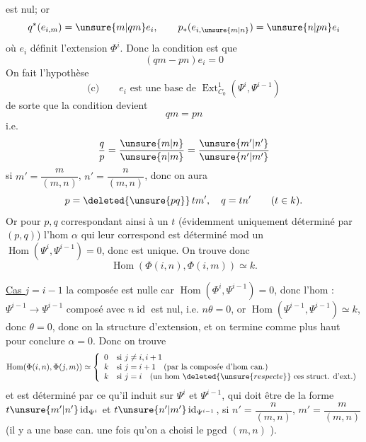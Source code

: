 est nul; or
\[
q^*(e_{i,m})=\unsure{m|qm}e_i,\qquad
p_*(e_{i,\unsure{m|n}})=\unsure{n|pn}e_i
\]
où $e_i$ définit l'extension $\Phi^i$.
Donc la condition est que
\[
(qm-pn)e_i=0
\]
On fait l'hypothèse
\[
\text{(c)}\qquad
\boxed{e_i\text{ est une base de }\operatorname{Ext}^1_{C_0}(\Psi^i,\Psi^{i-1})}
\]
de sorte que la condition devient
\[
qm=pn
\]
i.e.\quad
\[
\frac q p=\frac{\unsure{m|n}}{\unsure{n|m}}
=\frac{\unsure{m'|n'}}{\unsure{n'|m'}}
\]
si $m'=\dfrac{m}{(m,n)}$, $n'=\dfrac{n}{(m,n)}$, donc
on aura
\[
p=\deleted{\unsure{pq}}\,t m',\quad q=t n'\qquad(t\in k).
\]
Or pour $p,q$ correspondant ainsi
à un $t$ (évidemment uniquement
déterminé par $(p,q)$) l'hom
$\alpha$ qui leur correspond est déterminé
mod un $\operatorname{Hom}(\Psi^i,\Psi^{i-1})=0$,
donc est unique. On trouve donc
\[
\operatorname{Hom}(\Phi(i,n),\Phi(i,m))\simeq k.
\]

\uline{Cas $j=i-1$}
la composée
est nulle car $\operatorname{Hom}(\Phi^i,\Psi^{i-1})=0$,
donc l'hom
:
$\Psi^{i-1}\longrightarrow\Psi^{i-1}$
composé avec $n\operatorname{id}$ est nul, i.e.
$n\theta=0$, or $\operatorname{Hom}(\Psi^{i-1},\Psi^{i-1})\simeq k$, donc
$\theta=0$, donc on  la structure
d'extension, et on termine comme
plus haut pour conclure
$\alpha=0$. Donc on trouve
\[
\operatorname{Hom}(\Phi(i,n),\Phi(j,m))\simeq
\left\{\begin{array}{ll}
0&\text{si }j\neq i,i+1\\
k&\text{si }j=i+1\quad\text{(par la composée d'hom can.)}\\
k&\text{si }j=i\quad\text{(un hom }\deleted{\unsure{respecte}}\text{ ces struct. d'ext.)}
\end{array}\right.
\]
et est déterminé par ce qu'il induit
sur $\Psi^i$ et $\Psi^{i-1}$, qui doit être de
la forme $t\unsure{m'|n'}\operatorname{id}_{\Psi^i}$ et $t\unsure{n'|m'}\operatorname{id}_{\Psi^{i-1}}$,
si $n'=\dfrac{n}{(m,n)}$, $m'=\dfrac{m}{(m,n)}$ (il y a
une base can. une fois qu'on a
choisi le pgcd $(m,n)$ ).


